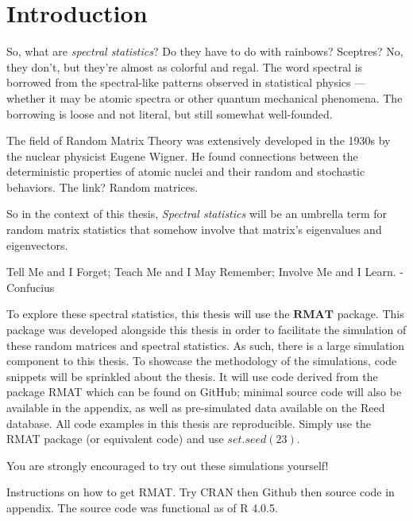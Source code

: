 
  \chapter*{Introduction}


So, what are \textit{spectral statistics}? Do they have to do with rainbows? Sceptres? No, they don’t, but they’re almost as colorful and regal. The word spectral is borrowed from the spectral-like patterns observed in statistical physics --- whether it may be atomic spectra or other quantum mechanical phenomena. The borrowing is loose and not literal, but still somewhat well-founded.

The field of Random Matrix Theory was extensively developed in the 1930s by the nuclear physicist Eugene Wigner. He found connections between the deterministic properties of atomic nuclei and their random and stochastic behaviors. The link? Random matrices.

So in the context of this thesis, \textit{Spectral statistics} will be an umbrella term for random matrix statistics that somehow involve that matrix's eigenvalues and eigenvectors.




\begin{displayquote}
Tell Me and I Forget; Teach Me and I May Remember; Involve Me and I Learn.
-Confucius
\end{displayquote}

To explore these spectral statistics, this thesis will use the $\textbf{RMAT}$ package. This package was developed alongside this thesis in order to facilitate the simulation of these random matrices and spectral statistics. As such, there is a large simulation component to this thesis. To showcase the methodology of the simulations, code snippets will be sprinkled about the thesis. It will use code derived from the package RMAT which can be found on GitHub; minimal source code will also be available in the appendix, as well as pre-simulated data available on the Reed database. All code examples in this thesis are reproducible. Simply use the RMAT package (or equivalent code) and use $set.seed(23)$.

You are strongly encouraged to try out these simulations yourself!

Instructions on how to get RMAT. Try CRAN then Github then source code in appendix. The source code was functional as of R 4.0.5.

